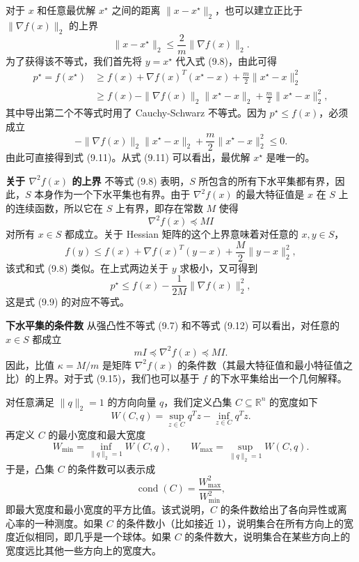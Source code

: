 \documentclass[UTF8,12pt,a4paper,fontset=fandol]{ctexart}
\begin{document}
对于 $x$ 和任意最优解 $x^\star$ 之间的距离 $\|x-x^\star\|_2$，也可以建立正比于 $\|\nabla f(x)\|_2$ 的上界
\begin{equation}
\|x-x^\star\|_2\leq\frac{2}{m}\|\nabla f(x)\|_2.
\tag{9.11}
\end{equation}
为了获得该不等式，我们首先将 $y=x^\star$ 代入式 (9.8)，由此可得
\[
\begin{aligned}
p^\star=f(x^\star)
&\geq f(x)+\nabla f(x)^T(x^\star-x)+\frac{m}{2}\|x^\star-x\|_2^2\\
&\geq f(x)-\|\nabla f(x)\|_2\|x^\star-x\|_2+\frac{m}{2}\|x^\star-x\|_2^2,
\end{aligned}
\]
其中导出第二个不等式时用了 Cauchy-Schwarz 不等式。因为 $p^\star\leq f(x)$，必须成立
\[
-\|\nabla f(x)\|_2\|x^\star-x\|_2+\frac{m}{2}\|x^\star-x\|_2^2\leq0.
\]
由此可直接得到式 (9.11)。从式 (9.11) 可以看出，最优解 $x^\star$ 是唯一的。

\noindent\textbf{关于 $\nabla^2 f(x)$ 的上界}\quad
不等式 (9.8) 表明，$S$ 所包含的所有下水平集都有界，因此，$S$ 本身作为一个下水平集也有界。由于 $\nabla^2 f(x)$ 的最大特征值是 $x$ 在 $S$ 上的连续函数，所以它在 $S$ 上有界，即存在常数 $M$ 使得
\begin{equation}
\nabla^2 f(x)\preceq MI
\tag{9.12}
\end{equation}
对所有 $x\in S$ 都成立。关于 Hessian 矩阵的这个上界意味着对任意的 $x,y\in S$，
\begin{equation}
f(y)\leq f(x)+\nabla f(x)^T(y-x)+\frac{M}{2}\|y-x\|_2^2,
\tag{9.13}
\end{equation}
该式和式 (9.8) 类似。在上式两边关于 $y$ 求极小，又可得到
\begin{equation}
p^\star\leq f(x)-\frac{1}{2M}\|\nabla f(x)\|_2^2,
\tag{9.14}
\end{equation}
这是式 (9.9) 的对应不等式。

\noindent\textbf{下水平集的条件数}\quad
从强凸性不等式 (9.7) 和不等式 (9.12) 可以看出，对任意的 $x\in S$ 都成立
\begin{equation}
mI\preceq\nabla^2 f(x)\preceq MI.
\tag{9.15}
\end{equation}
因此，比值 $\kappa=M/m$ 是矩阵 $\nabla^2 f(x)$ 的条件数（其最大特征值和最小特征值之比）的上界。对于式 (9.15)，我们也可以基于 $f$ 的下水平集给出一个几何解释。

对任意满足 $\|q\|_2=1$ 的方向向量 $q$，我们定义凸集 $C\subseteq\mathbb{R}^n$ 的宽度如下
\[
W(C,q)=\sup_{z\in C}q^Tz-\inf_{z\in C}q^Tz.
\]
再定义 $C$ 的最小宽度和最大宽度
\[
W_{\min}=\inf_{\|q\|_2=1}W(C,q),\qquad
W_{\max}=\sup_{\|q\|_2=1}W(C,q).
\]
于是，凸集 $C$ 的条件数可以表示成
\[
\operatorname{cond}(C)=\frac{W_{\max}^2}{W_{\min}^2},
\]
即最大宽度和最小宽度的平方比值。该式说明，$C$ 的条件数给出了各向异性或离心率的一种测度。如果 $C$ 的条件数小（比如接近 1），说明集合在所有方向上的宽度近似相同，即几乎是一个球体。如果 $C$ 的条件数大，说明集合在某些方向上的宽度远比其他一些方向上的宽度大。
\end{document}
